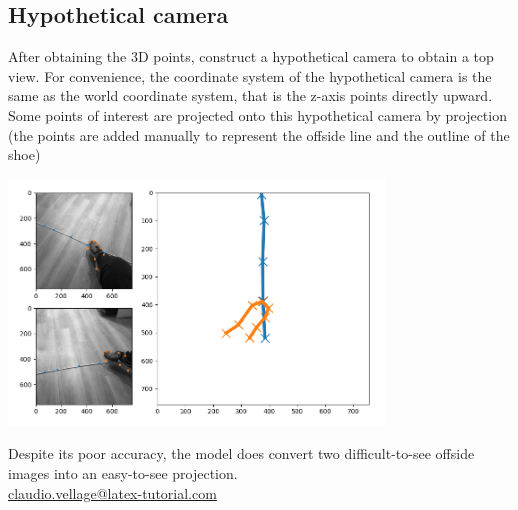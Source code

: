 \documentclass[12pt]{article}
\begin{document}
	\subsection{Hypothetical camera}
		After obtaining the 3D points, construct a hypothetical camera to obtain a top view. For convenience, the coordinate system of the hypothetical camera is the same as the world coordinate system, that is the z-axis points directly upward. Some points of interest are projected onto this hypothetical camera by projection (the points are added manually to represent the offside line and the outline of the shoe)
		\begin{center}
			\includegraphics[width=0.75\textwidth]{results.png}
		\end{center}
		Despite its poor accuracy, the model does convert two difficult-to-see offside images into an easy-to-see projection.\\
		\href{mailto:claudio.vellage@latex-tutorial.com}{claudio.vellage@latex-tutorial.com}
	\newpage
	
	
\end{document}
